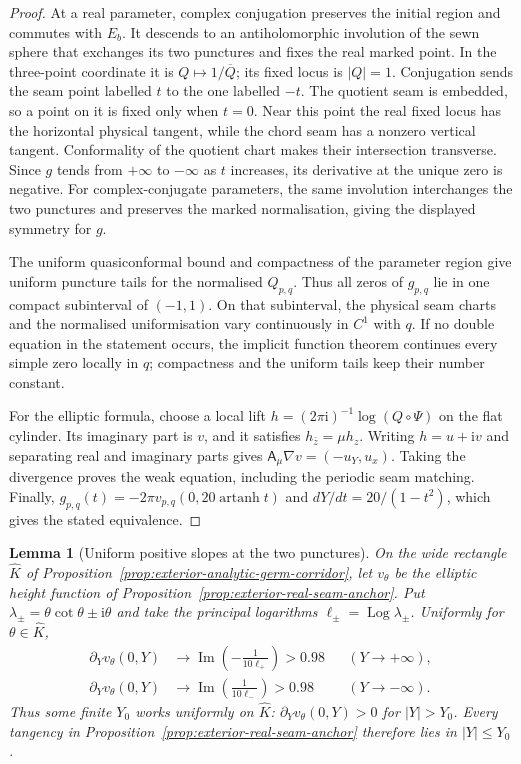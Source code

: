 \documentclass[11pt,a4paper]{article}
\newtheorem{lemma}[theorem]{Lemma}
\theoremstyle{definition}
\newcommand{\ii}{\mathrm{i}}
\begin{document}
\begin{proof}
At a real parameter, complex conjugation preserves the initial
region and commutes with $E_b$.  It descends to an antiholomorphic
involution of the sewn sphere that exchanges its two punctures and
fixes the real marked point.  In the three-point coordinate it is
$Q\mapsto1/\overline Q$; its fixed locus is $|Q|=1$.
Conjugation sends the seam point labelled $t$ to the one labelled
$-t$.  The quotient seam is embedded, so a point on it is fixed
only when $t=0$.  Near this point the real fixed locus has the
horizontal physical tangent, while the chord seam has a nonzero
vertical tangent.  Conformality of the quotient chart makes their
intersection transverse.  Since $g$ tends from $+\infty$ to
$-\infty$ as $t$ increases, its derivative at the unique zero is
negative.
For complex-conjugate parameters, the same involution interchanges
the two punctures and preserves the marked normalisation, giving the
displayed symmetry for $g$.

The uniform quasiconformal bound and compactness of the parameter
region give uniform puncture tails for the normalised $Q_{p,q}$.
Thus all zeros of $g_{p,q}$ lie in one compact subinterval of
$(-1,1)$.  On that subinterval, the physical seam charts and the
normalised uniformisation vary continuously in $C^1$ with $q$.
If no double equation in the statement occurs, the implicit
function theorem continues every simple zero locally in $q$;
compactness and the uniform tails keep their number constant.

For the elliptic formula, choose a local lift
$h=(2\pi\ii)^{-1}\log(Q\circ\Psi)$ on the flat cylinder.
Its imaginary part is $v$, and it satisfies
$h_{\bar z}=\mu h_z$.  Writing $h=u+\ii v$ and separating real
and imaginary parts gives
$\mathsf A_\mu\nabla v=(-u_Y,u_x)$.
Taking the divergence proves the weak equation, including the
periodic seam matching.  Finally,
$g_{p,q}(t)=-2\pi v_{p,q}(0,20\operatorname{artanh}t)$ and
$dY/dt=20/(1-t^2)$, which gives the stated equivalence.
\end{proof}

\begin{lemma}[Uniform positive slopes at the two punctures]
\label{lem:exterior-seam-end-slope}
On the wide rectangle $\widehat K$ of
Proposition~\ref{prop:exterior-analytic-germ-corridor}, let
$v_\theta$ be the elliptic height function of
Proposition~\ref{prop:exterior-real-seam-anchor}.  Put
$\lambda_\pm=\theta\cot\theta\pm\ii\theta$ and take the
principal logarithms $\ell_\pm=\operatorname{Log}\lambda_\pm$.
Uniformly for $\theta\in\widehat K$,
\[
 \begin{aligned}
 \partial_Yv_\theta(0,Y)&\longrightarrow
       \operatorname{Im}\!\left(-\frac1{10\ell_+}\right)>0.98
       &&(Y\to+\infty),\\
 \partial_Yv_\theta(0,Y)&\longrightarrow
       \operatorname{Im}\!\left(\frac1{10\ell_-}\right)>0.98
       &&(Y\to-\infty).
 \end{aligned}
\]
Thus some finite $Y_0$ works uniformly on $\widehat K$:
$\partial_Yv_\theta(0,Y)>0$ for $|Y|>Y_0$.
Every tangency in Proposition~\ref{prop:exterior-real-seam-anchor}
therefore lies in $|Y|\le Y_0$.
\end{lemma}
\end{document}
